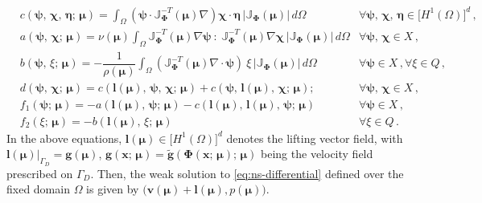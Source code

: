 \documentclass[12pt, a4paper, twoside, openright]{report}
\numberwithin{equation}{chapter}
\theoremstyle{theorem}
\theoremstyle{definition}
\theoremstyle{remark}
\theoremstyle{proposition}
\numberwithin{figure}{chapter}
\newcommand{\wt}[1]{\widetilde{#1}}
\newcommand{\bg}[1]{\boldsymbol{#1}}
\begin{document}
		\begin{subequations}
			\label{eq:ns-weak-forms}
			\begin{align}
				\label{eq:ns-weak-forms-c-reference}
				& c(\bg{\psi}, \, \bg{\chi}, \, \bg{\eta}; \, \bg{\mu}) = \int_{\Omega} \left( \bg{\psi} \cdot \mathbb{J}^{-T}_{\bg{\Phi}}(\bg{\mu}) \nabla \right) \bg{\chi} \cdot \bg{\eta} \, \lvert \mathbb{J}_{\bg{\Phi}}(\bg{\mu}) \rvert \, d \Omega & \forall \bg{\psi}, \, \bg{\chi}, \, \bg{\eta} \in \big[ H^1(\Omega) \big]^d \, , \\[0.1cm]
				\label{eq:ns-weak-forms-a-reference}
				& a(\bg{\psi}, \, \bg{\chi}; \, \bg{\mu}) = \nu(\bg{\mu}) \int_{\Omega} \mathbb{J}^{-T}_{\bg{\Phi}}(\bg{\mu}) \nabla \bg{\psi} ~ : ~ \mathbb{J}^{-T}_{\bg{\Phi}}(\bg{\mu}) \nabla \bg{\chi} \, \lvert \mathbb{J}_{\bg{\Phi}}(\bg{\mu}) \rvert \, d \Omega & \forall \bg{\psi}, \, \bg{\chi} \in X \, , \\[0.1cm]
				\label{eq:ns-weak-forms-b-reference}
				& b(\bg{\psi}, \, \xi; \, \bg{\mu}) = - \dfrac{1}{\rho(\bg{\mu})} \int_{\Omega} \left( \mathbb{J}^{-T}_{\bg{\Phi}}(\bg{\mu}) \nabla \cdot \bg{\psi} \right) ~ \xi \, \lvert \mathbb{J}_{\bg{\Phi}}(\bg{\mu}) \rvert \, d \Omega & \forall \bg{\psi} \in X \, , \forall \xi \in Q \, , \\[0.1cm]
				\label{eq:ns-weak-forms-d-reference}
				& d(\bg{\psi}, \, \bg{\chi}; \, \bg{\mu}) = c(\bg{l}(\bg{\mu}), \, \bg{\psi}, \, \bg{\chi}; \, \bg{\mu}) + c(\bg{\psi}, \, \bg{l}(\bg{\mu}), \, \bg{\chi}; \, \bg{\mu}); & \forall \bg{\psi}, \, \bg{\chi} \in X \, , \\[0.1cm]
				\label{eq:ns-weak-forms-f1-reference}
				& f_1(\bg{\psi}; \, \bg{\mu}) = - a(\bg{l}(\bg{\mu}), \, \bg{\psi}; \, \bg{\mu}) - c(\bg{l}(\bg{\mu}), \, \bg{l}(\bg{\mu}), \, \bg{\psi}; \, \bg{\mu}) & \forall \bg{\psi} \in X \, , \\[0.2cm]
				\label{eq:ns-weak-forms-f2-reference}
				& f_2(\xi; \, \bg{\mu}) = - b(\bg{l}(\bg{\mu}), \, \xi; \, \bg{\mu}) & \forall \xi \in Q \, .
			\end{align}
		\end{subequations}
		In the above equations, $\bg{l}(\bg{\mu}) \in \big[ H^1(\Omega) \big]^d$ denotes the lifting vector field, with $\bg{l}(\bg{\mu}) \big\rvert_{\Gamma_D} = \bg{g}(\bg{\mu})$, $\bg{g}(\bg{x}; \, \bg{\mu}) = \wt{\bg{g}}(\bg{\Phi}(\bg{x}; \, \bg{\mu}); \, \bg{\mu})$ being the velocity field prescribed on $\Gamma_D$. Then, the weak solution to \eqref{eq:ns-differential} defined over the fixed domain $\Omega$ is given by $\big( \bg{v}(\bg{\mu}) + \bg{l}(\bg{\mu}), p(\bg{\mu}) \big)$.
		
\end{document}
